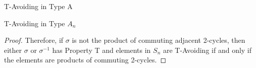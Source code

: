 \documentclass[11pt]{amsart}
\theoremstyle{definition}
\numberwithin{equation}{section}
\renewcommand{\(}{\left(}
\renewcommand{\)}{\right)}
\begin{document}
\begin{section}{T-Avoiding in Type A}
\begin{subsection}{T-Avoiding in Type \textbf{$A_n$}}
\begin{proof}
Therefore, if $\sigma$ is not the product of commuting adjacent 2-cycles, then either $\sigma$ or $\sigma^{-1}$ has Property T and elements in $S_n$ are T-Avoiding if and only if the elements are products of commuting 2-cycles.   
\end{proof}

\end{subsection}
	
\end{section}




\end{document}
